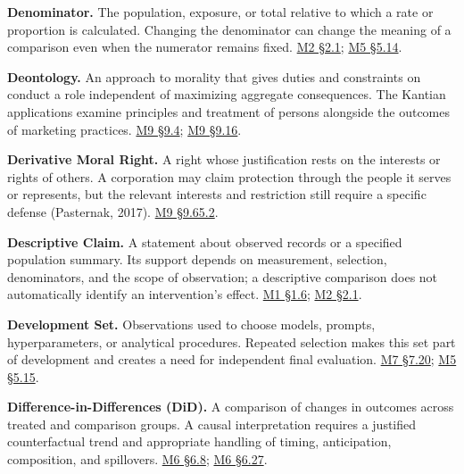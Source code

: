 \noindent\textbf{Denominator.} The population, exposure, or total relative to
which a rate or proportion is calculated. Changing the denominator can
change the meaning of a comparison even when the numerator remains
fixed.
\href{Marketing_Analytics_Lecture_Notes.pdf\#M02-define-the-population-before-the-metric}{M2
§2.1};
\href{Marketing_Analytics_Lecture_Notes.pdf\#M05-earnings-calls-pricing-language-speaking-exposure-and-meaning}{M5
§5.14}.

\noindent\textbf{Deontology.} An approach to morality that gives duties and
constraints on conduct a role independent of maximizing aggregate
consequences. The Kantian applications examine principles and treatment
of persons alongside the outcomes of marketing practices.
\hyperref[M09-respect-for-persons-and-commercial-exchange]{M9
§9.4};
\hyperref[M09-a-kantian-critique-of-commercial-optimization]{M9
§9.16}.

\noindent\textbf{Derivative Moral Right.} A right whose justification rests on
the interests or rights of others. A corporation may claim protection
through the people it serves or represents, but the relevant interests
and restriction still require a specific defense (Pasternak, 2017).
\hyperref[M09-corporate-duties-and-human-protections]{M9
§9.65.2}.

\noindent\textbf{Descriptive Claim.} A statement about observed records or a
specified population summary. Its support depends on measurement,
selection, denominators, and the scope of observation; a descriptive
comparison does not automatically identify an intervention's effect.
\href{Marketing_Analytics_Lecture_Notes.pdf\#M01-interpreting-and-communicating-a-result}{M1
§1.6};
\href{Marketing_Analytics_Lecture_Notes.pdf\#M02-define-the-population-before-the-metric}{M2
§2.1}.

\noindent\textbf{Development Set.} Observations used to choose models, prompts,
hyperparameters, or analytical procedures. Repeated selection makes this
set part of development and creates a need for independent final
evaluation.
\href{Marketing_Analytics_Lecture_Notes.pdf\#M07-repeated-selection-can-improve-a-score-without-improving-prediction}{M7
§7.20};
\href{Marketing_Analytics_Lecture_Notes.pdf\#M05-repeated-prompt-revision-and-independent-text-evaluation}{M5
§5.15}.

\noindent\textbf{Difference-in-Differences (DiD).} A comparison of changes in
outcomes across treated and comparison groups. A causal interpretation
requires a justified counterfactual trend and appropriate handling of
timing, anticipation, composition, and spillovers.
\href{Marketing_Analytics_Lecture_Notes.pdf\#M06-difference-in-differences-and-a-counterfactual-trend}{M6
§6.8};
\href{Marketing_Analytics_Lecture_Notes.pdf\#M06-continuous-treatment-and-parallel-trends}{M6
§6.27}.

